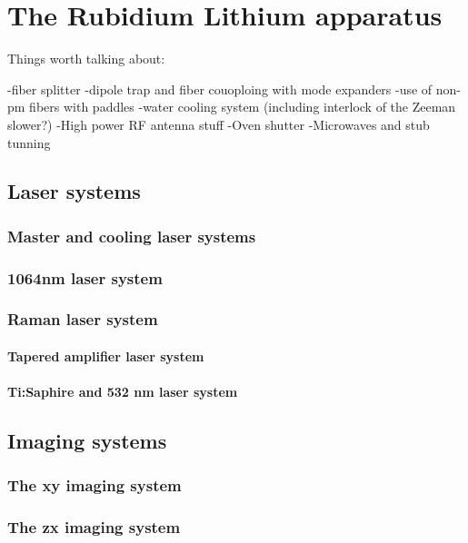 


\renewcommand{\thechapter}{4}


\chapter{The Rubidium Lithium apparatus}

Things worth talking about:

-fiber splitter
-dipole trap and fiber couoploing with mode expanders
-use of non-pm fibers with paddles
-water cooling system (including interlock of the Zeeman slower?)
-High power RF antenna stuff
-Oven shutter
-Microwaves and stub tunning


\section{Laser systems}
\subsection{Master and cooling laser systems}
\subsection{1064nm laser system}
\subsection{Raman laser system}
\subsubsection{Tapered amplifier laser system}
\subsubsection{Ti:Saphire and 532 nm laser system}

\section{Imaging systems}
\subsection{The xy imaging system}
\subsection{The zx imaging system}
